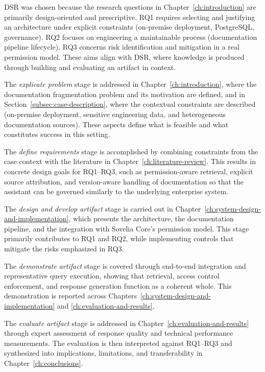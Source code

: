 DSR was chosen because the research questions in Chapter~\ref{ch:introduction} are primarily design-oriented and prescriptive. RQ1 requires selecting and justifying an architecture under explicit constraints (on-premise deployment, PostgreSQL, governance). RQ2 focuses on engineering a maintainable process (documentation pipeline lifecycle). RQ3 concerns risk identification and mitigation in a real permission model. These aims align with DSR, where knowledge is produced through building and evaluating an artifact in context.

The \emph{explicate problem} stage is addressed in Chapter~\ref{ch:introduction}, where the documentation fragmentation problem and its motivation are defined, and in Section~\ref{subsec:case-description}, where the contextual constraints are described (on-premise deployment, sensitive engineering data, and heterogeneous documentation sources). These aspects define what is feasible and what constitutes success in this setting.

The \emph{define requirements} stage is accomplished by combining constraints from the case context with the literature in Chapter~\ref{ch:literature-review}. This results in concrete design goals for RQ1--RQ3, such as permission-aware retrieval, explicit source attribution, and version-aware handling of documentation so that the assistant can be governed similarly to the underlying enterprise system.

The \emph{design and develop artifact} stage is carried out in Chapter~\ref{ch:system-design-and-implementation}, which presents the architecture, the documentation pipeline, and the integration with Sovelia Core's permission model. This stage primarily contributes to RQ1 and RQ2, while implementing controls that mitigate the risks emphasized in RQ3.

The \emph{demonstrate artifact} stage is covered through end-to-end integration and representative query execution, showing that retrieval, access control enforcement, and response generation function as a coherent whole. This demonstration is reported across Chapters~\ref{ch:system-design-and-implementation} and \ref{ch:evaluation-and-results}.

The \emph{evaluate artifact} stage is addressed in Chapter~\ref{ch:evaluation-and-results} through expert assessment of response quality and technical performance measurements. The evaluation is then interpreted against RQ1--RQ3 and synthesized into implications, limitations, and transferability in Chapter~\ref{ch:conclusions}.

